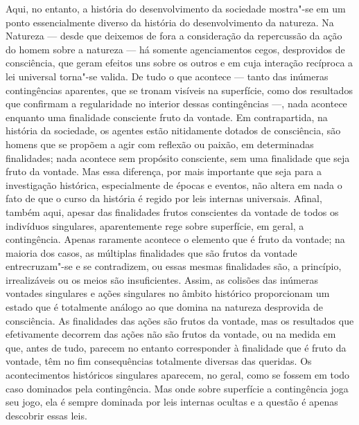 Aqui, no entanto, a história do desenvolvimento da sociedade mostra"-se %
em um ponto essencialmente diverso da história do desenvolvimento da
natureza. Na Natureza --- desde que deixemos de fora a consideração da
repercussão da ação do homem sobre a natureza --- há 
somente agenciamentos cegos, desprovidos de consciência, que geram
efeitos uns sobre os outros e em cuja interação recíproca a lei
universal torna"-se valida. De tudo o que acontece --- tanto das inúmeras
contingências aparentes, que se tronam visíveis na superfície, como dos
resultados que confirmam a regularidade no 
interior dessas contingências ---, nada acontece enquanto uma finalidade
consciente fruto da vontade. Em contrapartida, na história da sociedade,
os agentes estão nitidamente dotados de consciência, são homens que se
propõem a agir com reflexão ou paixão, em determinadas finalidades; nada
acontece sem propósito consciente, sem uma finalidade que seja fruto da
vontade. Mas essa diferença, por mais importante que seja para a
investigação histórica, especialmente de épocas e eventos, não altera em
nada o fato de que o curso da história é regido por leis internas
universais. Afinal, também aqui, apesar das finalidades frutos %
conscientes da vontade de todos os indivíduos singulares, aparentemente
rege sobre superfície, em geral, a contingência. Apenas raramente
acontece o elemento que é fruto da vontade; na maioria dos casos, as
múltiplas finalidades que são frutos da vontade entrecruzam"-se e se
contradizem, ou essas mesmas finalidades são, a princípio, irrealizáveis
ou os meios são insuficientes. Assim, as colisões das inúmeras vontades
singulares e ações singulares no âmbito histórico proporcionam um estado
que é totalmente análogo ao que domina na natureza desprovida de
consciência. As finalidades das ações são frutos da vontade, mas os
resultados que efetivamente decorrem das ações não são frutos da vontade,
ou na medida em que, antes de tudo, parecem no entanto corresponder à
finalidade que é fruto da vontade, têm no fim consequências totalmente
diversas das queridas. Os acontecimentos históricos singulares aparecem, %
no geral, como se fossem em todo caso dominados pela
contingência. Mas onde sobre superfície a contingência joga seu jogo,
ela é sempre dominada por leis internas ocultas e a questão é apenas
descobrir essas leis.

